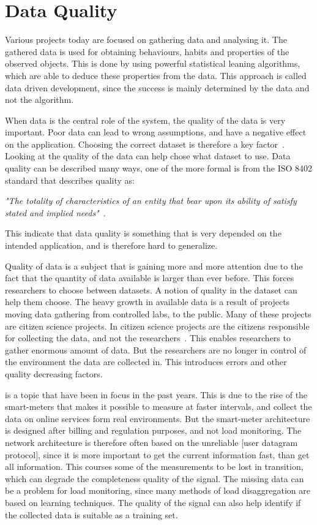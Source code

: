 \chapter{Data Quality}
\label{Sec:DataQuality}
Various projects today are focused on gathering data and analysing it. The gathered data is used for obtaining behaviours, habits and properties of the observed objects. This is done by using powerful statistical leaning algorithms, which are able to deduce these properties from the data. This approach is called data driven development, since the success is mainly determined by the data and not the algorithm. 

When data is the central role of the system, the quality of the data is very important. Poor data can lead to wrong assumptions, and have a negative effect on the application. Choosing the correct dataset is therefore a key factor~\cite{RefWorks:3}. Looking at the quality of the data can help chose what dataset to use. Data quality can be described many ways, one of the more formal is from the ISO 8402 standard that describes quality as: 

\begin{adjustwidth}{2.5em}{2.5em}
\emph{"The totality of characteristics of an entity that bear upon its ability of satisfy stated and implied needs"}~\cite{RefWorks:5}.
\end{adjustwidth}

This indicate that data quality is something that is very depended on the intended application, and is therefore hard to generalize. 

Quality of data is a subject that is gaining more and more attention due to the fact that the quantity of data available is larger than ever before. This forces researchers to choose between datasets. A notion of quality in the dataset can help them choose. The heavy growth in available data is a result of projects moving data gathering from controlled labs, to the public. Many of these projects are citizen science projects. In citizen science projects are the citizens responsible for collecting the data, and not the researchers~\cite{RefWorks:2}. This enables researchers to gather enormous amount of data. But the researchers are no longer in control of the environment the data are collected in. This introduces errors and other quality decreasing factors. 

 is a topic that have been in focus in the past years. This is due to the rise of the smart-meters that makes it possible to measure at faster intervals, and collect the data on online services form real environments. But the smart-meter architecture is designed after billing and regulation purposes, and not load monitoring. The network architecture is therefore often based on the unreliable [user datagram protocol], since it is more important to get the current information fast, than get all information. This courses some of the measurements to be lost in transition, which can degrade the completeness quality of the signal. The missing data can be a problem for load monitoring, since many methods of load disaggregation are based on learning techniques. The quality of the signal can also help identify if the collected data is suitable as a training set. 



